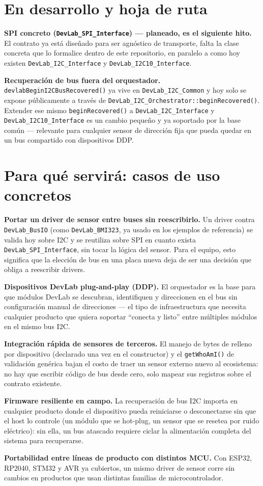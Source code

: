 \documentclass[11pt,a4paper]{article}
\newcommand{\code}[1]{\texttt{\small #1}}
\begin{document}
\section*{En desarrollo y hoja de ruta}

\textbf{SPI concreto (\code{DevLab\_SPI\_Interface}) --- planeado, es el siguiente hito.} El contrato ya está diseñado para ser agnóstico de transporte, falta la clase concreta que lo formalice dentro de este repositorio, en paralelo a como hoy existen \code{DevLab\_I2C\_Interface} y \code{DevLab\_I2C10\_Interface}.

\textbf{Recuperación de bus fuera del orquestador.} \code{devlabBeginI2CBusRecovered()} ya vive en \code{DevLab\_I2C\_Common} y hoy solo se expone públicamente a través de \code{DevLab\_I2C\_Orchestrator::beginRecovered()}. Extender ese mismo \code{beginRecovered()} a \code{DevLab\_I2C\_Interface} y \code{DevLab\_I2C10\_Interface} es un cambio pequeño y ya soportado por la base común --- relevante para cualquier sensor de dirección fija que pueda quedar en un bus compartido con dispositivos DDP.

\section*{Para qué servirá: casos de uso concretos}

\textbf{Portar un driver de sensor entre buses sin reescribirlo.} Un driver contra \code{DevLab\_BusIO} (como \code{DevLab\_BMI323}, ya usado en los ejemplos de referencia) se valida hoy sobre I2C y se reutiliza sobre SPI en cuanto exista \code{DevLab\_SPI\_Interface}, sin tocar la lógica del sensor. Para el equipo, esto significa que la elección de bus en una placa nueva deja de ser una decisión que obliga a reescribir drivers.

\textbf{Dispositivos DevLab plug-and-play (DDP).} El orquestador es la base para que módulos DevLab se descubran, identifiquen y direccionen en el bus sin configuración manual de direcciones --- el tipo de infraestructura que necesita cualquier producto que quiera soportar ``conecta y listo'' entre múltiples módulos en el mismo bus I2C.

\textbf{Integración rápida de sensores de terceros.} El manejo de bytes de relleno por dispositivo (declarado una vez en el constructor) y el \code{getWhoAmI()} de validación genérica bajan el costo de traer un sensor externo nuevo al ecosistema: no hay que escribir código de bus desde cero, solo mapear sus registros sobre el contrato existente.

\textbf{Firmware resiliente en campo.} La recuperación de bus I2C importa en cualquier producto donde el dispositivo pueda reiniciarse o desconectarse sin que el host lo controle (un módulo que se hot-plug, un sensor que se resetea por ruido eléctrico): sin ella, un bus atascado requiere ciclar la alimentación completa del sistema para recuperarse.

\textbf{Portabilidad entre líneas de producto con distintos MCU.} Con ESP32, RP2040, STM32 y AVR ya cubiertos, un mismo driver de sensor corre sin cambios en productos que usan distintas familias de microcontrolador.
\end{document}
